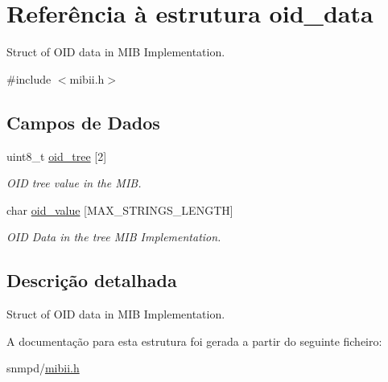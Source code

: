 \hypertarget{structoid__data}{\section{Referência à estrutura oid\+\_\+data}
\label{structoid__data}
}


Struct of O\+I\+D data in M\+I\+B Implementation.  




{\ttfamily \#include $<$mibii.\+h$>$}

\subsection*{Campos de Dados}
\begin{DoxyCompactItemize}
\item 
\hypertarget{structoid__data_a2675b7bf5cd84760d8e230b3f689d57d}{uint8\+\_\+t \hyperlink{structoid__data_a2675b7bf5cd84760d8e230b3f689d57d}{oid\+\_\+tree} \mbox{[}2\mbox{]}}\label{structoid__data_a2675b7bf5cd84760d8e230b3f689d57d}

\begin{DoxyCompactList}\small\item\em O\+I\+D tree value in the M\+I\+B. \end{DoxyCompactList}\item 
\hypertarget{structoid__data_a52f4f4b7f346c9d0a125c0cf2d934a73}{char \hyperlink{structoid__data_a52f4f4b7f346c9d0a125c0cf2d934a73}{oid\+\_\+value} \mbox{[}M\+A\+X\+\_\+\+S\+T\+R\+I\+N\+G\+S\+\_\+\+L\+E\+N\+G\+T\+H\mbox{]}}\label{structoid__data_a52f4f4b7f346c9d0a125c0cf2d934a73}

\begin{DoxyCompactList}\small\item\em O\+I\+D Data in the tree M\+I\+B Implementation. \end{DoxyCompactList}\end{DoxyCompactItemize}


\subsection{Descrição detalhada}
Struct of O\+I\+D data in M\+I\+B Implementation. 

A documentação para esta estrutura foi gerada a partir do seguinte ficheiro\+:\begin{DoxyCompactItemize}
\item 
snmpd/\hyperlink{mibii_8h}{mibii.\+h}\end{DoxyCompactItemize}
